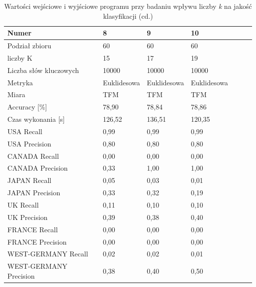 \documentclass{classrep}
\begin{document}
{{                \begin{table}[!htbp]
                \centering
                \begin{tabular}{|l|l|l|l|l|l|l|}
                    \hline
                    Numer                   & 8           & 9               & 10               \\ \hline
                    Podział zbioru          & 60		  & 60		        & 60		      \\ \hline
                    liczby K                & 15		  & 17		        & 19		      \\ \hline
                    Liczba słów kluczowych  & 10000		  & 10000		    & 10000		      \\ \hline
                    Metryka                	& Euklidesowa & Euklidesowa	    & Euklidesowa	  \\ \hline
                    Miara                   & TFM		  & TFM		        & TFM		      \\ \hline
                    Accuracy {[}\%{]}       & 78,90		  & 78,84		    & 78,86		      \\ \hline
                    Czas wykonania {[}s{]}  & 126,52	  & 136,51	        & 120,35	      \\ \hline
                    USA Recall              & 0,99		  & 0,99		    & 0,99		      \\ \hline
                    USA Precision           & 0,80		  & 0,80		    & 0,80		      \\ \hline
                    CANADA Recall           & 0,00		  & 0,00		    & 0,00		      \\ \hline
                    CANADA Precision        & 0,33		  & 1,00		    & 1,00		      \\ \hline
                    JAPAN Recall            & 0,05		  & 0,03		    & 0,01		      \\ \hline
                    JAPAN Precision         & 0,33		  & 0,32		    & 0,19		      \\ \hline
                    UK Recall               & 0,11		  & 0,10		    & 0,10		      \\ \hline
                    UK Precision            & 0,39		  & 0,38		    & 0,40		      \\ \hline
                    FRANCE Recall           & 0,00		  & 0,00		    & 0,00		      \\ \hline
                    FRANCE Precision        & 0,00		  & 0,00		    & 0,00		      \\ \hline
                    WEST-GERMANY Recall     & 0,02		  & 0,02		    & 0,01		      \\ \hline
                    WEST-GERMANY Precision  & 0,38		  & 0,40		    & 0,50		      \\ \hline
                    \end{tabular}
                    \caption{Wartości wejściowe i wyjściowe programu przy badaniu wpływu liczby \emph{k} na jakość klasyfikacji (cd.)} \label{table-k3}
                \end{table}
                \FloatBarrier

}}
\end{document}
